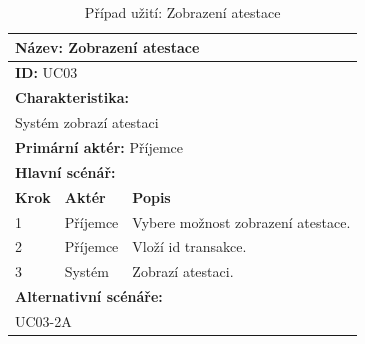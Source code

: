 \vspace{-1mm} %
\renewcommand{\arraystretch}{1.5} %
\begin{table}[h]
	\centering
	\begin{tabular}{|p{1cm}|p{2cm}|p{10cm}|}
		\hline
		\multicolumn{3}{|l|}{\textbf{Název:} Zobrazení atestace} \\ \hline
		\multicolumn{3}{|l|}{\textbf{ID:} UC03} \\ \hline
		\multicolumn{3}{|l|}{\textbf{Charakteristika:}} \\ \hline
		\multicolumn{3}{|l|}{Systém zobrazí atestaci} \\ \hline
		\multicolumn{3}{|l|}{\textbf{Primární aktér:} Příjemce} \\ \hline
		\multicolumn{3}{|l|}{\textbf{Hlavní scénář:}} \\ \hline
		\textbf{Krok} & \textbf{Aktér} & \textbf{Popis} \\ \hline
		1 & Příjemce  & Vybere možnost zobrazení atestace. \\ \hline
		2 & Příjemce  & Vloží id transakce. \\ \hline
		3 & Systém    & Zobrazí atestaci. \\ \hline
		
		\multicolumn{3}{|l|}{\textbf{Alternativní scénáře:}} \\ \hline
		\multicolumn{3}{|l|}{UC03-2A} \\ \hline
		
	\end{tabular}
	\vspace{10pt} %
	\caption{Případ užití: Zobrazení atestace}
	\label{tab:usecase-view-attestation}
\end{table}
\renewcommand{\arraystretch}{1} %




